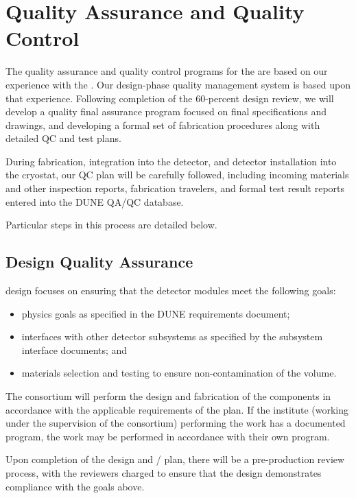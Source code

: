 \section{Quality Assurance and Quality Control}
\label{sec:fdsp-pd-qaqc}

The quality assurance and quality control programs for the  are based on our experience with the .  Our design-phase quality management system is based upon that experience.  Following completion of the 60-percent design review, we will develop a quality final assurance program focused on final specifications and drawings, and developing a formal set of fabrication procedures along with detailed QC and test plans.

During fabrication, integration into the detector, and detector installation into the cryostat, our QC plan will be carefully followed, including incoming materials and other inspection reports, fabrication travelers, and formal test result reports entered into the DUNE QA/QC database.

Particular steps in this process are detailed below.

\subsection{Design Quality Assurance}
\label{sec:fdsp-pd-designqa}

 design  focuses on ensuring that the detector modules meet the following goals:
\begin{itemize}
\item physics goals as specified in the DUNE requirements document;
\item interfaces with other detector subsystems as specified by the subsystem interface documents; and
\item materials selection and testing to ensure non-contamination of the \lar volume.
\end{itemize}

The  consortium will perform the design and fabrication of the components in accordance with the applicable requirements of the   plan. If the institute (working under the supervision of the consortium) performing the work has a documented  program, the work may be performed in accordance with their own program.

Upon completion of the  design and / plan, there will be a pre-production review process, with the reviewers charged to ensure that the design demonstrates compliance with the goals above.

